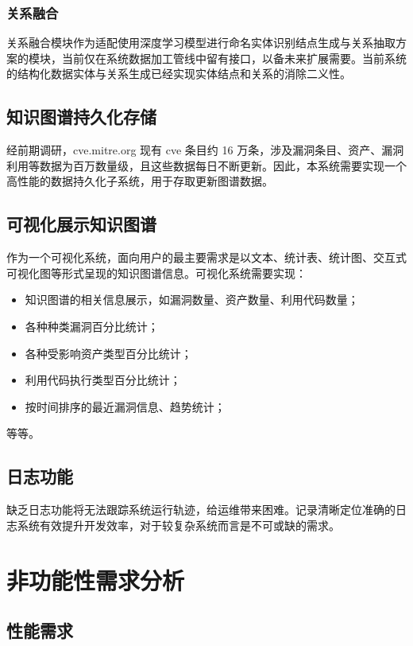 \documentclass[a4paper,AutoFakeBold,oneside,12pt]{book}
\begin{document}
\subsubsection{关系融合}

关系融合模块作为适配使用深度学习模型进行命名实体识别结点生成与关系抽取方案的模块，当前仅在系统数据加工管线中留有接口，以备未来扩展需要。当前系统的结构化数据实体与关系生成已经实现实体结点和关系的消除二义性。

\subsection{知识图谱持久化存储}

经前期调研，cve.mitre.org 现有 cve 条目约 16 万条，涉及漏洞条目、资产、漏洞利用等数据为百万数量级，且这些数据每日不断更新。因此，本系统需要实现一个高性能的数据持久化子系统，用于存取更新图谱数据。

\subsection{可视化展示知识图谱}

作为一个可视化系统，面向用户的最主要需求是以文本、统计表、统计图、交互式可视化图等形式呈现的知识图谱信息。可视化系统需要实现：
\begin{itemize}
	\item 知识图谱的相关信息展示，如漏洞数量、资产数量、利用代码数量；
	\item 各种种类漏洞百分比统计；
	\item 各种受影响资产类型百分比统计；
	\item 利用代码执行类型百分比统计；
	\item 按时间排序的最近漏洞信息、趋势统计；
\end{itemize}
等等。

\subsection{日志功能}

缺乏日志功能将无法跟踪系统运行轨迹，给运维带来困难。记录清晰定位准确的日志系统有效提升开发效率，对于较复杂系统而言是不可或缺的需求。

\section{非功能性需求分析}

\subsection{性能需求}
\end{document}
